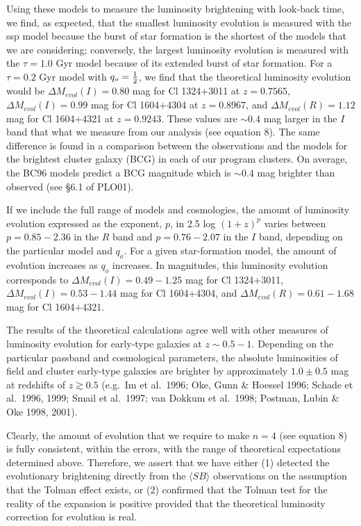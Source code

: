 \documentclass[preprint]{aastex}
\begin{document}
Using these models to measure the luminosity brightening with
look-back time, we find, as expected, that the smallest luminosity
evolution is measured with the ssp model because the burst of star
formation is the shortest of the models that we are considering;
conversely, the largest luminosity evolution is measured with the
$\tau = 1.0$ Gyr model because of its extended burst of star
formation.  For a $\tau = 0.2$ Gyr model with $q_o = {1\over{2}}$, we
find that the theoretical luminosity evolution would be $\Delta
M_{evol} (I) = 0.80$ mag for Cl 1324+3011 at $z = 0.7565$, $\Delta
M_{evol} (I) = 0.99$ mag for Cl 1604+4304 at $z = 0.8967$, and $\Delta
M_{evol} (R) = 1.12$ mag for Cl 1604+4321 at $z = 0.9243$. These
values are $\sim 0.4$ mag larger in the $I$ band that what we measure
from our analysis (see equation 8). The same difference is found in a
comparison between the observations and the models for the brightest
cluster galaxy (BCG) in each of our program clusters. On average, the
BC96 models predict a BCG magnitude which is $\sim 0.4$ mag brighter
than observed (see \S 6.1 of PLO01).

If we include the full range of models and cosmologies, the amount of
luminosity evolution expressed as the exponent, $p$, in 2.5 log
$(1+z)^p$ varies between $p = 0.85 - 2.36$ in the $R$ band and $p =
0.76 - 2.07$ in the $I$ band, depending on the particular model and
$q_o$. For a given star-formation model, the amount of evolution
increases as $q_o$ increases. In magnitudes, this luminosity evolution
corresponds to $\Delta M_{evol} (I) = 0.49 - 1.25$ mag for Cl
1324+3011, $\Delta M_{evol} (I) = 0.53 - 1.44$ mag for Cl 1604+4304,
and $\Delta M_{evol} (R) = 0.61 - 1.68$ mag for Cl 1604+4321.

The results of the theoretical calculations agree well with other
measures of luminosity evolution for early-type galaxies at $z \sim
0.5 - 1$. Depending on the particular passband and cosmological
parameters, the absolute luminosities of field and cluster early-type
galaxies are brighter by approximately $1.0 \pm 0.5$ mag at redshifts
of $ z \gtrsim 0.5$ (e.g.\ Im et al.\ 1996; Oke, Gunn \& Hoessel 1996;
Schade et al.\ 1996, 1999; Smail et al.\ 1997; van Dokkum et al.\
1998; Postman, Lubin \& Oke 1998, 2001).

Clearly, the amount of evolution that we require to make $n=4$ (see
equation 8) is fully consistent, within the errors, with the range of
theoretical expectations determined above. Therefore, we assert that
we have either (1) detected the evolutionary brightening directly from
the $\langle SB \rangle$ observations on the assumption that the
Tolman effect exists, or (2) confirmed that the Tolman test for the
reality of the expansion is positive provided that the theoretical
luminosity correction for evolution is real.
\end{document}
